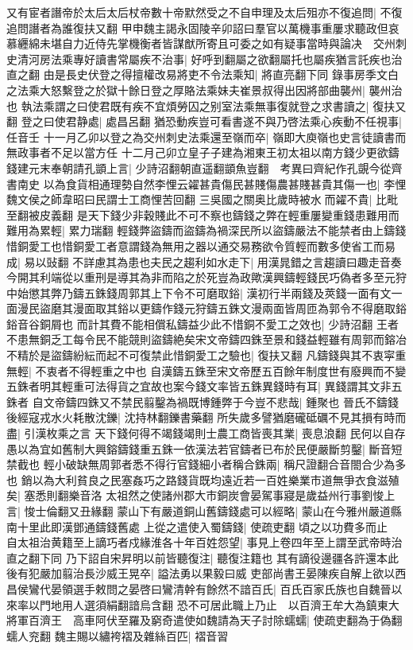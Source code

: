 又有宦者譖帝於太后太后杖帝數十帝默然受之不自申理及太后殂亦不復追問|{
	不復追問譖者為誰復扶又翻}
甲申魏主謁永固陵辛卯詔曰羣官以萬機事重屢求聽政但哀慕纒綿未堪自力近侍先掌機衡者皆謀猷所寄且可委之如有疑事當時與論决　交州刺史清河房法乘專好讀書常屬疾不治事|{
	好呼到翻屬之欲翻屬托也屬疾猶言託疾也治直之翻}
由是長史伏登之得擅權改易將吏不令法乘知|{
	將直亮翻下同}
錄事房季文白之法乘大怒繫登之於獄十餘日登之厚賂法乘妹夫崔景叔得出因將部曲襲州|{
	襲州治也}
執法乘謂之曰使君既有疾不宜煩勞囚之别室法乘無事復就登之求書讀之|{
	復扶又翻}
登之曰使君静處|{
	處昌呂翻}
猶恐動疾豈可看書遂不與乃啓法乘心疾動不任視事|{
	任音壬}
十一月乙卯以登之為交州刺史法乘還至嶺而卒|{
	嶺即大庾嶺也史言徒讀書而無政事者不足以當方任}
十二月己卯立皇子子建為湘東王初太祖以南方錢少更欲鑄錢建元末奉朝請孔顗上言|{
	少詩沼翻朝直遥翻顗魚豈翻　考異曰齊紀作孔覬今從齊書南史}
以為食貨相通理勢自然李悝云糴甚貴傷民甚賤傷農甚賤甚貴其傷一也|{
	李悝魏文侯之師韋昭曰民謂士工商悝苦回翻}
三吳國之關奥比歲時被水而糴不貴|{
	比毗至翻被皮義翻}
是天下錢少非穀賤此不可不察也鑄錢之弊在輕重屢變重錢患難用而難用為累輕|{
	累力瑞翻}
輕錢弊盜鑄而盜鑄為禍深民所以盜鑄嚴法不能禁者由上鑄錢惜銅愛工也惜銅愛工者意謂錢為無用之器以通交易務欲令質輕而數多使省工而易成|{
	易以䜴翻}
不詳慮其為患也夫民之趨利如水走下|{
	用漢晁錯之言趨讀曰趣走音奏}
今開其利端從以重刑是導其為非而陷之於死豈為政歟漢興鑄輕錢民巧偽者多至元狩中始懲其弊乃鑄五銖錢周郭其上下令不可磨取鋊|{
	漢初行半兩錢及莢錢一面有文一面漫民盜磨其漫面取其鋊以更鑄作錢元狩鑄五銖文漫兩面皆周匝為郭令不得磨取鋊鋊音谷銅屑也}
而計其費不能相償私鑄益少此不惜銅不愛工之效也|{
	少詩沼翻}
王者不患無銅乏工每令民不能競則盜鑄絶矣宋文帝鑄四銖至景和錢益輕雖有周郭而鎔冶不精於是盜鑄紛紜而起不可復禁此惜銅愛工之驗也|{
	復扶又翻}
凡鑄錢與其不衷寜重無輕|{
	不衷者不得輕重之中也}
自漢鑄五銖至宋文帝歷五百餘年制度世有廢興而不變五銖者明其輕重可法得貨之宜故也案今錢文率皆五銖異錢時有耳|{
	異錢謂其文非五銖者}
自文帝鑄四銖又不禁民翦鑿為禍既博鍾弊于今豈不悲哉|{
	鍾聚也}
晉氏不鑄錢後經寇戎水火耗散沈鑠|{
	沈持林翻鑠書藥翻}
所失歲多譬猶磨礲砥礪不見其損有時而盡|{
	引漢枚乘之言}
天下錢何得不竭錢竭則士農工商皆喪其業|{
	喪息浪翻}
民何以自存愚以為宜如舊制大興鎔鑄錢重五銖一依漢法若官鑄者已布於民便嚴斷剪鑿|{
	斷音短禁截也}
輕小破缺無周郭者悉不得行官錢細小者稱合銖兩|{
	稱尺證翻合音閤合少為多也}
銷以為大利貧良之民塞姦巧之路錢貨既均遠近若一百姓樂業市道無爭衣食滋殖矣|{
	塞悉則翻樂音洛}
太祖然之使諸州郡大市銅炭會晏駕事寢是歲益州行事劉悛上言|{
	悛士倫翻又丑緣翻}
蒙山下有嚴道銅山舊鑄錢處可以經略|{
	蒙山在今雅州嚴道縣南十里此即漢鄧通鑄錢舊處}
上從之遣使入蜀鑄錢|{
	使疏吏翻}
頃之以功費多而止　自太祖治黄籍至上謫巧者戍緣淮各十年百姓怨望|{
	事見上卷四年至上謂至武帝時治直之翻下同}
乃下詔自宋昇明以前皆聽復注|{
	聽復注籍也}
其有謫役邊疆各許還本此後有犯嚴加翦治長沙威王晃卒|{
	謚法勇以果毅曰威}
吏部尚書王晏陳疾自解上欲以西昌侯鸞代晏領選手敕問之晏啓曰鸞清幹有餘然不諳百氏|{
	百氏百家氏族也自魏晉以來率以門地用人選須絹翻諳烏含翻}
恐不可居此職上乃止　以百濟王牟大為鎮東大將軍百濟王　高車阿伏至羅及窮奇遣使如魏請為天子討除蠕蠕|{
	使疏吏翻為于偽翻蠕人兖翻}
魏主賜以繡袴褶及雜絲百匹|{
	褶音習}


